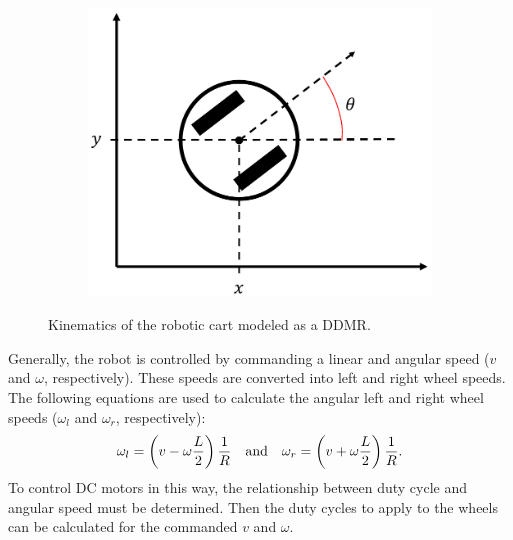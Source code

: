 \documentclass[conference]{IEEEtran}
\begin{document}
\begin{figure}[htbp]
\begin{subfigure}{0.4\linewidth}
        \includegraphics[width=\textwidth]{figs/robotPose.pdf}
        \caption{}
        \label{fig:robotPose}
    \end{subfigure}
    \caption{Kinematics of the robotic cart modeled as a DDMR.}
    \label{fig:robotModelParameters}
\end{figure}
%
Generally, the robot is controlled by commanding a linear and angular speed ($v$ and $\omega$, respectively). These speeds are converted into left and right wheel speeds. The following equations are used to calculate the angular left and right wheel speeds ($\omega_l$ and $\omega_r$, respectively): %
%
\begin{align*}
  \omega_l = \left(v - \omega\frac{L}{2}\right)\frac{1}{R}\qq{and} \omega_r = \left(v + \omega\frac{L}{2}\right)\frac{1}{R}.
\end{align*}
%
To control DC motors in this way, the relationship between duty cycle and angular speed must be determined. Then the duty cycles to apply to the wheels can be calculated for the commanded $v$ and $\omega$.
\end{document}
